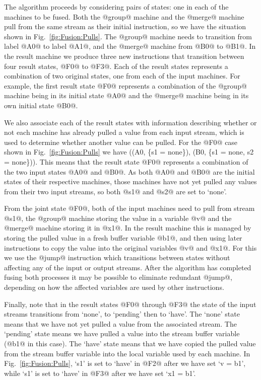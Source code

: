 The algorithm proceeds by considering pairs of states: one in each of the machines to be fused.
Both the @group@ machine and the @merge@ machine pull from the same stream as their initial instruction, so we have the situation shown in Fig.~\ref{fig:Fusion:Pulls}.
The @group@ machine needs to transition from label @A0@ to label @A1@, and the @merge@ machine from @B0@ to @B1@.
In the result machine we produce three new instructions that transition between four result states, @F0@ to @F3@.
Each of the result states represents a combination of two original states, one from each of the input machines.
For example, the first result state @F0@ represents a combination of the @group@ machine being in its initial state @A0@ and the @merge@ machine being in its own initial state @B0@. 

We also associate each of the result states with information describing whether or not each machine has already pulled a value from each input stream, which is used to determine whether another value can be pulled.
For the @F0@ case shown in Fig.~\ref{fig:Fusion:Pulls} we have ((A0, \{s1 = none\}), (B0, \{s1 = none, s2 = none\})).
This means that the result state @F0@ represents a combination of the two input states @A0@ and @B0@.
As both @A0@ and @B0@ are the initial states of their respective machines, those machines have not yet pulled any values from their two input streams, so both @s1@ and @s2@ are set to `none'.

From the joint state @F0@, both of the input machines need to pull from stream @s1@, the @group@ machine storing the value in a variable @v@ and the @merge@ machine storing it in @x1@.
In the result machine this is managed by storing the pulled value in a fresh buffer variable @b1@, and then using later instructions to copy the value into the original variables @v@ and @x1@.
For this we use the @jump@ instruction which transitions between states without affecting any of the input or output streams.
After the algorithm has completed fusing both processes it may be possible to eliminate redundant @jump@, depending on how the affected variables are used by other instructions.

Finally, note that in the result states @F0@ through @F3@ the state of the input streams transitions from `none', to `pending' then to `have'.
The `none' state means that we have not yet pulled a value from the associated stream.
The `pending' state means we have pulled a value into the stream buffer variable (@b1@ in this case).
The `have' state means that we have copied the pulled value from the stream buffer variable into the local variable used by each machine.
In Fig.~\ref{fig:Fusion:Pulls},  `s1' is set to `have' in @F2@ after we have set `v = b1', while `s1' is set to `have' in @F3@ after we have set `x1 = b1'. 


